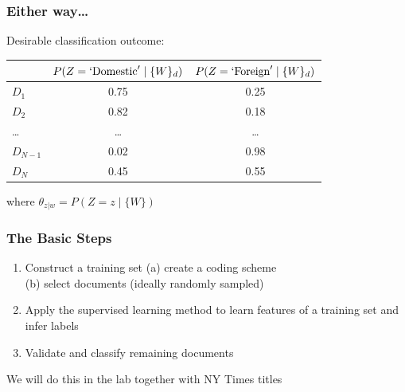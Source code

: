 \documentclass[11pt,compress,professionalfonts]{beamer}
\begin{document}



\begin{frame}[t,fragile]\frametitle{Either way\ldots}

Desirable classification outcome:

\begin{center}
\begin{tabular}{lcc}
& $P(Z=`\text{Domestic}'\mid \{W\}_d)$ & $P(Z=`\text{Foreign}' \mid \text \{W\}_d)$ \\ \toprule
$D_1$ & 0.75 & 0.25 \\
$D_2$ & 0.82 & 0.18 \\
\ldots & \ldots & \ldots\\
$D_{N-1}$ & 0.02 & 0.98 \\
$D_N$ & 0.45 & 0.55\\ \bottomrule
\end{tabular}
\end{center}

where $\theta_{z|w} = P(Z=z \mid \{W\})$

\end{frame}


\begin{frame}[t,fragile]\frametitle{The Basic Steps}
\begin{enumerate}
\item Construct a training set
(a) create a coding scheme\\
(b) select documents (ideally randomly sampled)
\item Apply the supervised learning method to learn features of a training set and infer labels
\item Validate and classify remaining documents\\
\end{enumerate}
We will do this in the lab together with NY Times titles
\end{frame}
\end{document}
